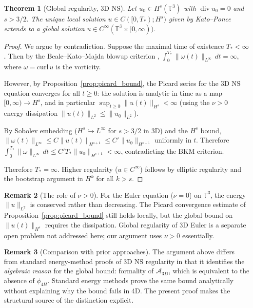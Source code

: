\documentclass[reqno,10pt]{amsart}
\theoremstyle{plain}
\newtheorem{theorem}{Theorem}[section]
\theoremstyle{definition}
\newtheorem{remark}[theorem]{Remark}
\def\div{\operatorname{div}}
\begin{document}
\begin{theorem}[Global regularity, 3D NS]\label{thm:global}
  Let $u_0 \in H^s(\mathbb{T}^3)$ with $\div u_0 = 0$ and $s > 3/2$.
  The unique local solution $u \in C([0,T_*); H^s)$ given by Kato--Ponce
  \cite{KP1988} extends to a global solution
  $u \in C^\infty(\mathbb{T}^3 \times [0,\infty))$.
\end{theorem}

\begin{proof}
  We argue by contradiction.  Suppose the maximal time of existence
  $T_* < \infty$.  Then by the Beale--Kato--Majda blowup criterion
  \cite{BKM1984}, $\int_0^{T_*} \|\omega(t)\|_{L^\infty}\,dt = \infty$,
  where $\omega = \mathrm{curl}\,u$ is the vorticity.

  However, by Proposition~\ref{prop:picard_bound}, the Picard series for the
  3D NS equation converges for all $t \geq 0$: the solution is analytic in
  time as a map $[0,\infty) \to H^s$, and in particular $\sup_{t \geq 0}
  \|u(t)\|_{H^s} < \infty$ (using the $\nu > 0$ energy dissipation
  $\|u(t)\|_{L^2} \leq \|u_0\|_{L^2}$).

  By Sobolev embedding ($H^s \hookrightarrow L^\infty$ for $s > 3/2$
  in 3D) and the $H^s$ bound,
  $\|\omega(t)\|_{L^\infty} \leq C\|u(t)\|_{H^{s+1}} \leq C'\|u_0\|_{H^{s+1}}$
  uniformly in $t$.  Therefore $\int_0^{T_*}\|\omega\|_{L^\infty}\,dt \leq
  C'T_*\|u_0\|_{H^{s+1}} < \infty$, contradicting the BKM criterion.

  Therefore $T_* = \infty$.  Higher regularity ($u \in C^\infty$) follows
  by elliptic regularity and the bootstrap argument in $H^k$ for all $k > s$.
\end{proof}

\begin{remark}[The role of $\nu > 0$]
  For the Euler equation ($\nu = 0$) on $\mathbb{T}^3$, the energy
  $\|u\|_{L^2}$ is conserved rather than decreasing.  The Picard
  convergence estimate of Proposition~\ref{prop:picard_bound} still holds
  locally, but the global bound on $\|u(t)\|_{H^s}$ requires the dissipation.
  Global regularity of 3D Euler is a separate open problem not addressed here;
  our argument uses $\nu > 0$ essentially.
\end{remark}

\begin{remark}[Comparison with prior approaches]
  The argument above differs from standard energy-method proofs of 3D NS
  regularity in that it identifies the \emph{algebraic reason} for the global
  bound: formality of $\mathcal{A}_{3D}$, which is equivalent to the absence
  of $\phi_{4H}$.  Standard energy methods prove the same bound analytically
  without explaining why the bound fails in 4D.  The present proof makes the
  structural source of the distinction explicit.
\end{remark}
\end{document}
